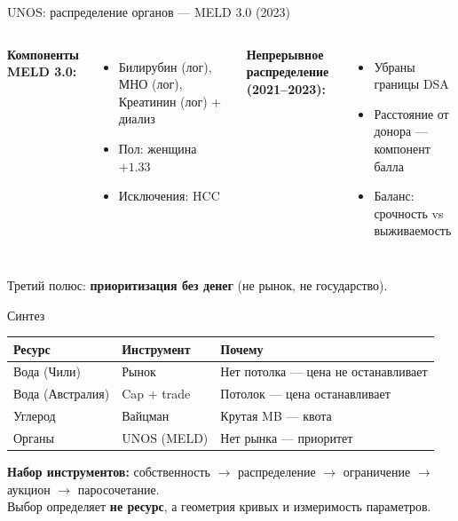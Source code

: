 \documentclass[10pt]{beamer}
\begin{document}
\begin{frame}{UNOS: распределение органов — MELD 3.0 (2023)}
  \begin{columns}
    \textbf{Компоненты MELD 3.0:}
    \begin{itemize}
      \item Билирубин (лог), МНО (лог), Креатинин (лог) + диализ
      \item Пол: женщина $+1.33$
      \item Исключения: HCC
    \end{itemize}
    \textbf{Непрерывное распределение (2021--2023):}
    \begin{itemize}
      \item Убраны границы DSA
      \item Расстояние от донора — компонент балла
      \item Баланс: срочность vs выживаемость
    \end{itemize}
  \end{columns}
  \vspace{0.5cm}
  \begin{alertblock}{}
    Третий полюс: \textbf{приоритизация без денег} (не рынок, не государство).
  \end{alertblock}
\end{frame}

\begin{frame}{Синтез}
  \centering
  \begin{tabular}{|>{\centering\arraybackslash}p{2.3cm}|>{\centering\arraybackslash}p{2.1cm}|>{\centering\arraybackslash}p{3.2cm}|} \hline
    \textbf{Ресурс} & \textbf{Инструмент} & \textbf{Почему} \\ \hline
    Вода (Чили) & Рынок & Нет потолка — цена не останавливает \\ \hline
    Вода (Австралия) & Cap + trade & Потолок — цена останавливает \\ \hline
    Углерод & Вайцман & Крутая MB — квота \\ \hline
    Органы & UNOS (MELD) & Нет рынка — приоритет \\ \hline
  \end{tabular}

  \vspace{0.8cm}
  \begin{block}{}
    \textbf{Набор инструментов:} собственность $\to$ распределение $\to$ ограничение $\to$ аукцион $\to$ паросочетание. \\
    Выбор определяет \textbf{не ресурс}, а геометрия кривых и измеримость параметров.
  \end{block}
\end{frame}
\end{document}
